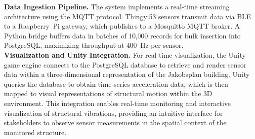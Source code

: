 \documentclass{eurodyn2026}
\begin{document}
\noindent \textbf{Data Ingestion Pipeline.} The system implements a real-time streaming 
architecture using the MQTT protocol. Thingy:53 sensors transmit data via BLE to a 
Raspberry~Pi gateway, which publishes to a Mosquitto MQTT broker. 
A Python bridge buffers data in batches of 10,000 records for bulk 
insertion into PostgreSQL, maximizing throughput at 400~Hz per sensor. \\




\noindent \textbf{Visualization and Unity Integration.} For real-time visualization, 
the Unity game engine connects to the PostgreSQL database to retrieve and 
render sensor data within a three-dimensional representation of the 
Jakobsplan building. Unity queries the database to obtain time-series acceleration data, 
which is then mapped to visual representations of structural motion within the 3D environment. 
This integration enables real-time monitoring and interactive visualization of structural vibrations, 
providing an intuitive interface for stakeholders to observe sensor measurements 
in the spatial context of the monitored structure.
\end{document}
